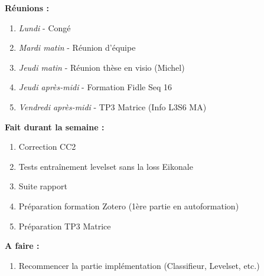 \textbf{Réunions :}
\begin{enumerate}[label=\textbullet]
	\item \textit{Lundi} - Congé
	\item \textit{Mardi matin} - Réunion d'équipe
	\item \textit{Jeudi matin} - Réunion thèse en visio (Michel)
	\item \textit{Jeudi après-midi} - Formation Fidle Seq 16
	\item \textit{Vendredi après-midi} - TP3 Matrice (Info L3S6 MA)
\end{enumerate}
\textbf{Fait durant la semaine :}
\begin{enumerate}[label=\textbullet]
	\item Correction CC2
	\item Tests entraînement levelset sans la loss Eikonale
	\item Suite rapport
	\item Préparation formation Zotero (1ère partie en autoformation)
	\item Préparation TP3 Matrice
\end{enumerate}
\textbf{A faire :}
\begin{enumerate}[label=\textbullet]
	\item Recommencer la partie implémentation (Classifieur, Levelset, etc.)
\end{enumerate}